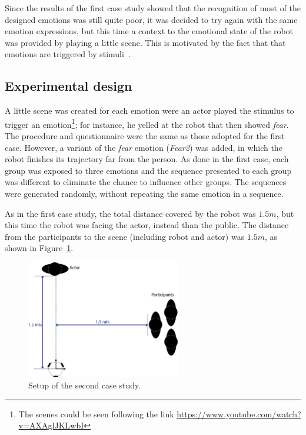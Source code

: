 Since the results of the first case study showed that the recognition of most of the designed emotions was still quite poor, it was decided to try again with the same emotion expressions, but this time a context to the emotional state of the robot was provided by playing a little scene. This is motivated by the fact that that emotions are triggered by stimuli~\cite{Plutchik2001,cacioppo2000handbook}.

\subsection{Experimental design}

A little scene was created for each emotion were an actor played the stimulus to trigger an emotion\footnote{The scenes could be seen following the link \url{https://www.youtube.com/watch?v=AXAglJKLwbI}}; for instance, he yelled at the robot that then showed \textit{fear}. The procedure and questionnaire were the same as those adopted for the first case. However, a variant of the \textit{fear} emotion (\textit{Fear2}) was added, in which the robot finishes its trajectory far from the person. As done in the first case, each group was exposed to three emotions and the sequence presented to each group was different to eliminate the chance to influence other groups. The sequences were generated randomly, without repeating the same emotion in a sequence.

As in the first case study, the total distance covered by the robot was $1.5 m$, but this time the robot was facing the actor, instead than the public. The distance from the participants to the scene (including robot and actor) was $1.5 m$, as shown in Figure~\ref{fig:setup2}. 

\begin{figure}[h]
	\centering
	\includegraphics[width=0.6\textwidth]{./Images/SecondCase.png} 
	\caption{Setup of the second case study.}
	\label{fig:setup2}
\end{figure}
